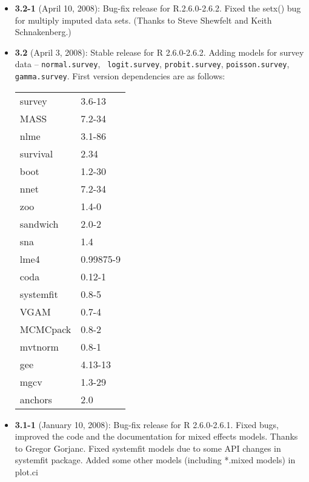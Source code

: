 \begin{itemize}
\item {\bf 3.2-1} (April 10, 2008): Bug-fix release for R.2.6.0-2.6.2.
  Fixed the {\rm setx()} bug for multiply imputed data sets. (Thanks
  to Steve Shewfelt and Keith Schnakenberg.)

\item {\bf 3.2} (April 3, 2008): Stable release for R 2.6.0-2.6.2.
  Adding models for survey data -- {\tt normal.survey}, {\tt
    logit.survey}, {\tt probit.survey}, {\tt poisson.survey}, {\tt
    gamma.survey}.  First version dependencies are as
  follows:\newline
\begin{tabular}{ll}\label{table.compat}
survey    & 3.6-13 \\
MASS      & 7.2-34 \\
nlme      & 3.1-86 \\
survival  & 2.34 \\
boot      & 1.2-30 \\
nnet      & 7.2-34 \\
zoo       & 1.4-0 \\
sandwich  & 2.0-2 \\
sna       & 1.4 \\
lme4      & 0.99875-9 \\
coda      & 0.12-1 \\
systemfit & 0.8-5 \\
VGAM      & 0.7-4 \\
MCMCpack  & 0.8-2 \\
mvtnorm   & 0.8-1 \\
gee       & 4.13-13 \\
mgcv      & 1.3-29 \\
anchors   & 2.0 
\end{tabular}

\item {\bf 3.1-1} (January 10, 2008): Bug-fix release for R
  2.6.0-2.6.1. Fixed bugs, improved the code and the documentation for
  mixed effects models. Thanks to Gregor Gorjanc. Fixed systemfit models 
  due to some API changes in systemfit package. Added some other models (including *.mixed models) in  plot.ci 


\end{itemize}

